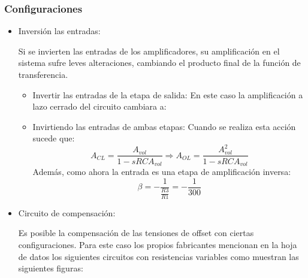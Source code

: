 \subsubsection{Configuraciones}

\begin{itemize}
    \item Inversión las entradas:
    
    Si se invierten las entradas de los amplificadores, su amplificación en el sistema sufre leves alteraciones, cambiando el producto final de la función de transferencia. 
    
    \begin{itemize}
        \item Invertir las entradas de la etapa de salida: En este caso la amplificación a lazo cerrado del circuito cambiara a:
        \item Invirtiendo las entradas de ambas etapas: Cuando se realiza esta acción sucede que:
        $$A_{CL} = \frac{A_{vol}}{1 - sRCA_{vol}} \Longrightarrow A_{OL} = \frac{A_{vol}^2}{1 - sRCA_{vol}}$$
        Además, como ahora la entrada es una etapa de amplificación inversa:
        $$\beta = -\frac{1}{\frac{R3}{R1}} = -\frac{1}{300}$$
    \end{itemize}
    
    \item Circuito de compensación:
    
    Es posible la compensación de las tensiones de offset con ciertas configuraciones. Para este caso los propios fabricantes mencionan en la hoja de datos los siguientes circuitos con resistencias variables como muestran las siguientes figuras:
    

\end{itemize}
